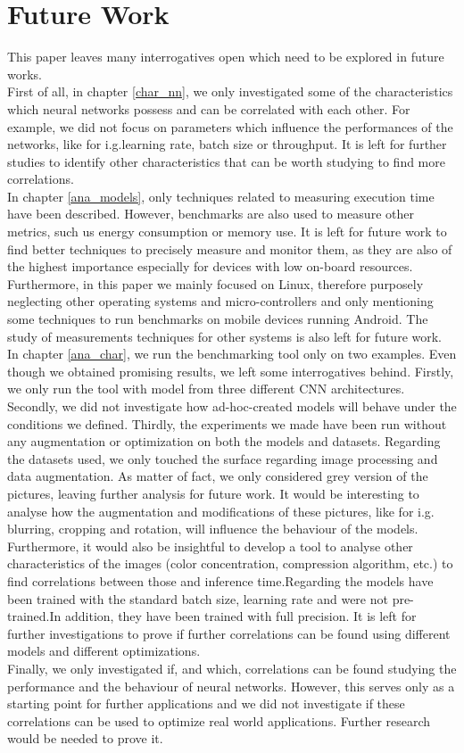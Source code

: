 \section{Future Work}
This paper leaves many interrogatives open which need to be explored in future works. \\
First of all, in chapter \ref{char_nn}, we only investigated some of the characteristics which neural networks possess and can be correlated with each other. For example, we did not focus on parameters which influence the performances of the networks, like for i.g.learning rate, batch size or throughput. It is left for further studies to identify other characteristics that can be worth studying to find more correlations.\\
In chapter \ref{ana_models}, only techniques related to measuring execution time have been described. However, benchmarks are also used to measure other metrics, such us energy consumption or memory use. It is left for future work to find better techniques to precisely measure and monitor them, as they are also of the highest importance especially for devices with low on-board resources. Furthermore, in this paper we mainly focused on Linux, therefore purposely neglecting other operating systems and micro-controllers and only mentioning some techniques to run benchmarks on mobile devices running Android. 
The study of measurements techniques for other systems is also left for future work. \\
In chapter \ref{ana_char}, we run the benchmarking tool only on two examples. Even though we obtained promising results, we left some interrogatives behind. Firstly, we only run the tool with model from three different CNN architectures. Secondly, we did not investigate how ad-hoc-created models will behave under the conditions we defined. Thirdly, the experiments we made have been run without any augmentation or optimization on both the models and datasets. Regarding the datasets used, we only touched the surface regarding image processing and data augmentation. As matter of fact, we only considered grey version of the pictures, leaving further analysis for future work. It would be interesting to analyse how the augmentation and modifications of these pictures, like for i.g. blurring, cropping and rotation, will influence the behaviour of the models. Furthermore, it would also be insightful to develop a tool to analyse other characteristics of the images (color concentration, compression algorithm, etc.) to find correlations between those and inference time.Regarding the models have been trained with the standard batch size, learning rate and were not pre-trained.In addition, they have been trained with full precision. It is left for further investigations to prove if further correlations can be found using different models and different optimizations.\\
Finally, we only investigated if, and which, correlations can be found studying the performance and the behaviour of neural networks. However, this serves only as a starting point for further applications and we did not investigate if these correlations can be used to optimize real world applications. Further research would be needed to prove it. 
